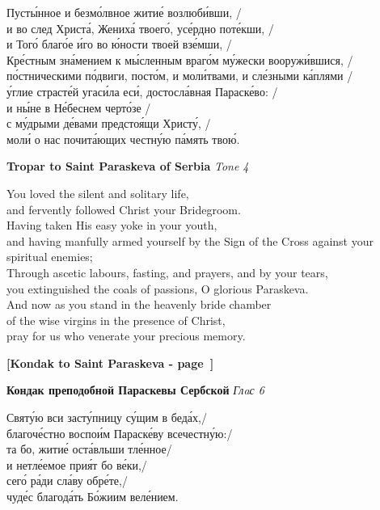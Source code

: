 \documentclass[twoside]{article}
\newcommand{\LITTITLE}[1]{\textbf{#1}} %
\newcommand{\LITSUB}  [1]{\textit{#1}} %
\begin{document}
\begin{paracol}{2}
\begin{paracol}{2}
{Пуст\'{ы}нное и безм\'{о}лвное жити\'{е} возлюб\'{и}вши, / \\
и во след Христ\'{а}, Жених\'{а} твоег\'{о}, ус\'{е}рдно пот\'{е}кши, / \\
и Тог\'{о} благ\'{о}е \'{и}го во \'{ю}ности твоей вз\'{е}мши, / \\
Кр\'{е}стным зн\'{а}мением к м\'{ы}сленным враг\'{о}м м\'{у}жески вооруж\'{и}вшися, / \\
п\'{о}стническими п\'{о}двиги, пост\'{о}м, и мол\'{и}твами, и сл\'{е}зными к\'{а}плями / \\
\'{у}глие страст\'{е}й угас\'{и}ла ес\'{и}, достосл\'{а}вная Параск\'{е}во: / \\
и н\'{ы}не в Н\'{е}беснем черт\'{о}зе / \\
с м\'{у}дрыми д\'{е}вами предсто\'{я}щи Христ\'{у}, / \\
мол\'{и} о нас почит\'{а}ющих честн\'{у}ю п\'{а}мять тво\'{ю}.
}
\switchcolumn

\LITTITLE{Tropar to Saint Paraskeva of Serbia}
\LITSUB{Tone 4}

You loved the silent and solitary life, \\
and fervently followed Christ your Bridegroom. \\
Having taken His easy yoke in your youth, \\
and having manfully armed yourself by the Sign of the Cross against your spiritual enemies; \\
Through ascetic labours, fasting, and prayers, and by your tears, \\
you extinguished the coals of passions, O glorious Paraskeva. \\
And now as you stand in the heavenly bride chamber \\
of the wise virgins in the presence of Christ, \\
pray for us who venerate your precious memory.

\end{paracol}

\LITTITLE{[Kondak to Saint Paraskeva - page~\pageref{Paraskeva_Kondak}]}\\

\begin{paracol}{2}

{
\LITTITLE{Кондак преподобной Параскевы Сербской}
\LITSUB{Глaс 6}

Свят\'{у}ю вси заст\'{у}пницу с\'{у}щим в бед\'{а}х,/ \\
благоч\'{е}стно воспо\'{и}м Параск\'{е}ву всечестн\'{у}ю:/ \\
та бо, жити\'{е} ост\'{а}вльши тл\'{е}нное/ \\
и нетл\'{е}емое при\'{я}т бо в\'{е}ки,/ \\
сег\'{о} р\'{а}ди сл\'{а}ву обр\'{е}те,/ \\
чуд\'{е}с благод\'{а}ть Б\'{о}жиим вел\'{е}нием.
}


\end{paracol}
\end{paracol}
\end{document}
